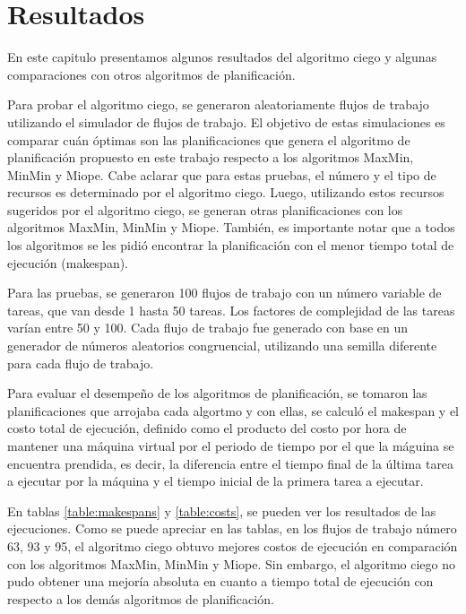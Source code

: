 \chapter{Resultados}

En este capitulo presentamos algunos resultados del algoritmo ciego y algunas comparaciones con otros algoritmos de planificación. 

Para probar el algoritmo ciego, se generaron aleatoriamente flujos de trabajo utilizando el simulador de flujos de trabajo. El objetivo de estas simulaciones es comparar cuán óptimas son las planificaciones que genera el algoritmo de planificación propuesto en este trabajo respecto a los algoritmos MaxMin, MinMin y Miope. Cabe aclarar que para estas pruebas, el número y el tipo de recursos es determinado por el algoritmo ciego. Luego, utilizando estos recursos sugeridos por el algoritmo ciego, se generan otras planificaciones con los algoritmos MaxMin, MinMin y Miope. También, es importante notar que a todos los algoritmos se les pidió encontrar la planificación con el menor tiempo total de ejecución (makespan). 

Para las pruebas, se generaron 100 flujos de trabajo con un número variable de tareas, que van desde 1 hasta 50 tareas. Los factores de complejidad de las tareas varían entre 50 y 100. Cada flujo de trabajo fue generado con base en un generador de números aleatorios congruencial, utilizando una semilla diferente para cada flujo de trabajo.

Para evaluar el desempeño de los algoritmos de planificación, se tomaron las planificaciones que arrojaba cada algortmo y con ellas, se calculó el makespan y el costo total de ejecución, definido como el producto del costo por hora de mantener una máquina virtual por el periodo de tiempo por el que la máguina se encuentra prendida, es decir, la diferencia entre el tiempo final de la última tarea a ejecutar por la máquina y el tiempo inicial de la primera tarea a ejecutar.

En tablas \ref{table:makespans} y \ref{table:costs}, se pueden ver los resultados de las ejecuciones. Como se puede apreciar en las tablas, en los flujos de trabajo número 63, 93 y 95, el algoritmo ciego obtuvo mejores costos de ejecución en comparación con los algoritmos MaxMin, MinMin y Miope. Sin embargo, el algoritmo ciego no pudo obtener una mejoría absoluta en cuanto a tiempo total de ejecución con respecto a los demás algoritmos de planificación. 

